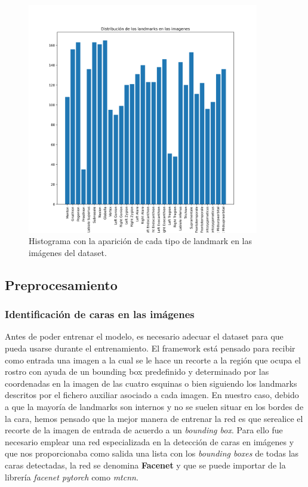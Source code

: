             \begin{figure}[!h]
                \centering
                \includegraphics[width=0.9\textwidth]{img/distribucion_landmarks_imagenes.png}
                \caption{Histograma con la aparición de cada tipo de landmark en las imágenes del dataset.}
                \label{fig:Histograma}
            \end{figure}
    
    \subsection{Preprocesamiento}
        
        \subsubsection{Identificación de caras en las imágenes}
            \noindent Antes de poder entrenar el modelo, es necesario adecuar el dataset para que pueda usarse durante el entrenamiento. El framework está pensado para recibir como entrada una imagen a la cual se le hace un recorte a la región que ocupa el rostro con ayuda de un bounding box predefinido y determinado por las coordenadas en la imagen de las cuatro esquinas o bien siguiendo los landmarks descritos por el fichero auxiliar asociado a cada imagen. En nuestro caso, debido a que la mayoría de landmarks son internos y no se suelen situar en los bordes de la cara, hemos pensado que la mejor manera de entrenar la red es que serealice el recorte de la imagen de entrada de acuerdo a un \textit{bounding box}. Para ello fue necesario emplear una red especializada en la detección de caras en imágenes y que nos proporcionaba como salida una lista con los \textit{bounding boxes} de todas las caras detectadas, la red se denomina \textbf{Facenet} y que se puede importar de la librería \textit{facenet pytorch} como \textit{mtcnn}.

